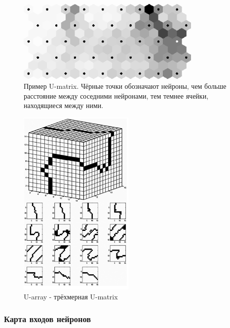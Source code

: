 \documentclass[a4paper,12pt]{article}
\begin{document}
\begin{minipage}{0.5\textwidth}
\begin{figure}[H]
  \centering
  \includegraphics[width=0.8\textwidth]{u-matrix.png}
  \caption{Пример U-matrix. Чёрные точки обозначают нейроны, чем больше расстояние между соседними нейронами, тем темнее ячейки, находящиеся между ними.}
  \label{u-matrix}
\end{figure}
\end{minipage}
\begin{minipage}{0.5\textwidth}
  \begin{figure}[H]
    \centering
    \includegraphics[width=0.5\textwidth]{u-array-rec.png}
    \caption{U-array - трёхмерная U-matrix}
    \label{u-array-rec}
  \end{figure}
\end{minipage}

\subsubsection{Карта входов нейронов}
\end{document}
